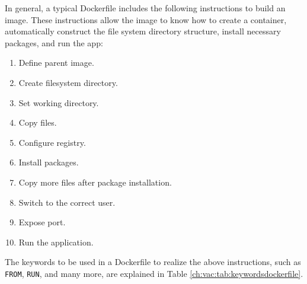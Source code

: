 In general, a typical Dockerfile includes the following instructions to build an image. These instructions allow the image to know how to create a container, automatically construct the file system directory structure, install necessary packages, and run the app:
\begin{enumerate}[(1)]
  \item Define parent image.
  \item Create filesystem directory.
  \item Set working directory.
  \item Copy files.
  \item Configure registry.
  \item Install packages.
  \item Copy more files after package installation.
  \item Switch to the correct user.
  \item Expose port.
  \item Run the application.
\end{enumerate}

The keywords to be used in a Dockerfile to realize the above instructions, such as \verb|FROM|, \verb|RUN|, and many more, are explained in Table \ref{ch:vac:tab:keywordsdockerfile}.

